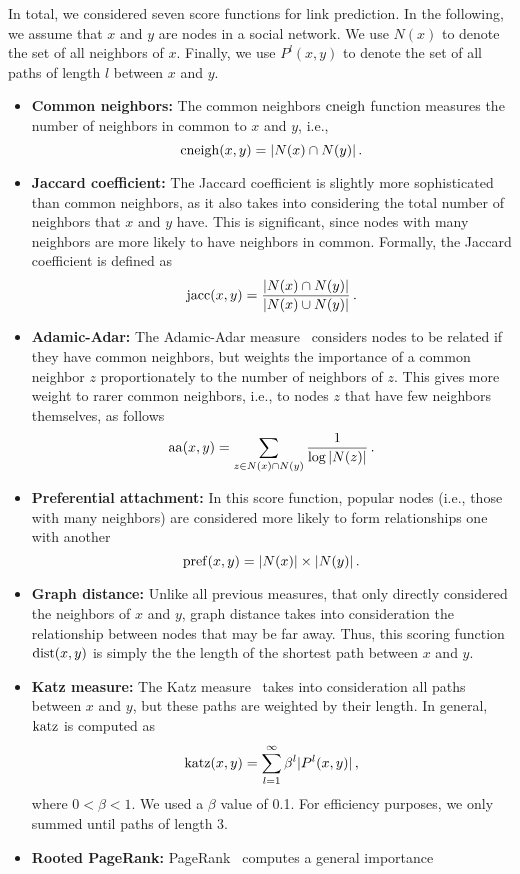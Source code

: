 In total, we considered seven score functions for link prediction. In the
following, we assume that $x$ and $y$ are nodes in a social
network. We use $N(x)$ to denote the set of all neighbors of
$x$. Finally, we
use $P^l(x,y)$ to denote the set of all paths of length $l$ between $x$
and $y$.
\begin{itemize}
\item {\bf Common neighbors:} The common neighbors ${\mathrm {cneigh}}$
  function measures the number of neighbors in common to $x$ and $y$,
  i.e., \[ {\mathrm {cneigh}}(x,y) = |N(x) \cap N(y)| \,.\]
\item {\bf Jaccard coefficient:} The Jaccard coefficient is slightly
  more sophisticated than common neighbors, as it also takes into
  considering the total number of neighbors that $x$ and $y$
  have. This is significant, since nodes with many neighbors are more
  likely to have neighbors in common. Formally, the Jaccard
  coefficient is defined as
\[ {\mathrm {jacc}}(x,y) = \frac{|N(x) \cap N(y)|}{|N(x) \cup N(y)|}\,.\]
\item {\bf Adamic-Adar:} The Adamic-Adar measure~\cite{} considers
  nodes to be related if they have common neighbors, but weights the
  importance of a common neighbor $z$ proportionately to the number of
  neighbors of $z$. This gives more weight to rarer common neighbors,
  i.e., to nodes $z$ that have few neighbors themselves, as follows
\[ {\mathrm {aa}}(x,y) = \sum_{z\in N(x)\cap N(y)} \frac{1}{\log{|N(z)|}}\,.\]
\item {\bf Preferential attachment:} In this score function, popular
  nodes (i.e., those with many neighbors) are considered more likely
  to form relationships one with another
\[ {\mathrm {pref}}(x,y) = |N(x)|\times |N(y)|\,.\]
\item {\bf Graph distance:} Unlike all previous measures, that only
  directly considered the neighbors of $x$ and $y$, graph distance
  takes into consideration the relationship between nodes that may be
  far away. Thus, this scoring function ${\mathrm {dist}}(x,y)$ is simply the
  the length of the shortest path between  $x$ and $y$. 
\item {\bf Katz measure:} The Katz measure~\cite{} takes into
  consideration all paths between $x$ and $y$, but these paths are
  weighted by their length. In general, ${\mathrm {katz}}$ is computed as
\[ {\mathrm {katz}}(x,y) = \sum_{l=1}^\infty \beta^l |P^l(x,y)|\,,\]
where $0<\beta<1$. We used a $\beta$ value of 0.1. For efficiency
purposes, we only summed until paths 
of length 3.
\item {\bf Rooted PageRank:} PageRank~\cite{} computes a general importance

\end{itemize}
